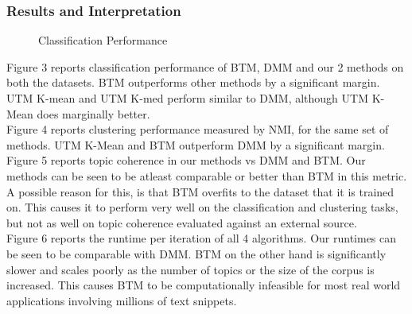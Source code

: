 \documentclass{sig-alternate-05-2015}
\begin{document}
\subsubsection{Results and Interpretation}
\begin{figure}[t!]
    \centering
    \caption{Classification Performance}
\end{figure}
Figure 3 reports classification performance of BTM, DMM and our 2 methods on both the datasets. BTM outperforms other methods by a significant margin. UTM K-mean and UTM K-med perform similar to DMM, although UTM K-Mean does marginally better.
\\[5pt]
Figure 4 reports clustering performance measured by NMI, for the same set of methods. UTM K-Mean and BTM outperform DMM by a significant margin.
\\[5pt]
Figure 5 reports topic coherence in our methods vs DMM and BTM. Our methods can be seen to be atleast comparable or better than BTM in this metric. A possible reason for this, is that BTM overfits to the dataset that it is trained on. This causes it to perform very well on the classification and clustering tasks, but not as well on topic coherence evaluated against an external source. 
\\[5pt]
Figure 6 reports the runtime per iteration of all 4 algorithms. Our runtimes can be seen to be comparable with DMM. BTM on the other hand is significantly slower and scales poorly as the number of topics or the size of the corpus is increased. This causes BTM to be computationally infeasible for most real world applications involving millions of text snippets. 
\end{document}
